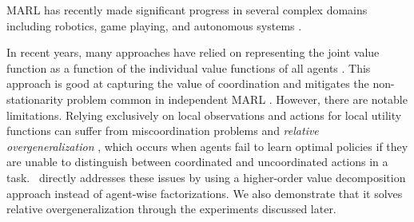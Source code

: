 
MARL has recently made significant progress in several complex domains including robotics, game playing, and autonomous systems \cite{oroojlooy2023review,vinyals2019grandmaster}. 

In recent years, many approaches have relied on representing the joint value function as a function of the individual value functions of all agents \cite{rashid2018qmix,rashid2020weighted,foerster2018counterfactual,son2019qtran,wang2021qplex,sunehag2018value}. This approach is good at capturing the value of coordination and mitigates the non-stationarity problem common in independent MARL \cite{tan1993multi,laurent2011world,matignon2012independent}. However, there are notable limitations. Relying exclusively on local observations and actions for local utility functions can suffer from miscoordination problems \cite{wang2021qplex,wang2022contextaware,lyu2023centralized} and \textit{relative overgeneralization} \cite{panait2006biasing,bohmer2020deep}, which occurs when agents fail to learn optimal policies if they are unable to distinguish between coordinated and uncoordinated actions in a task. \algoabb\ directly addresses these issues by using a higher-order value decomposition approach instead of agent-wise factorizations. We also demonstrate that it solves relative overgeneralization through the experiments discussed later. 



